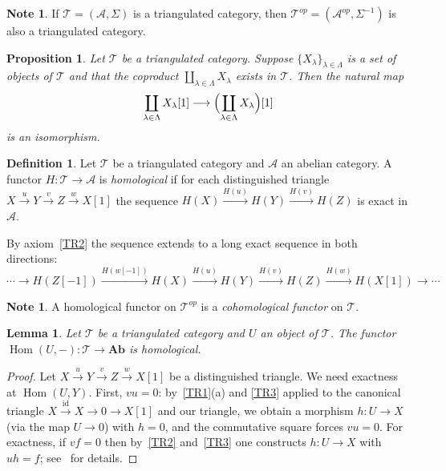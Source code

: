 \documentclass[12pt,a4paper]{article}
\newtheorem{proposition}[theorem]{Proposition}
\newtheorem{lemma}[theorem]{Lemma}
\theoremstyle{definition}
\newtheorem{definition}[theorem]{Definition}
\newtheorem{note}[theorem]{Note}
\newcommand{\Ab}{\mathbf{Ab}}
\newcommand{\Hom}{\operatorname{Hom}}
\newcommand{\id}{\mathrm{id}}
\begin{document}
\begin{note}\label{note:opposite}
If $\mathcal{T}=(\mathcal{A},\Sigma)$ is a triangulated category, then
$\mathcal{T}^{op}=(\mathcal{A}^{op},\Sigma^{-1})$ is also a triangulated category.
\end{note}

\begin{proposition}\label{prop:coproducts}
Let $\mathcal{T}$ be a triangulated category.  Suppose $\{X_\lambda\}_{\lambda\in\Lambda}$
is a set of objects of $\mathcal{T}$ and that the coproduct
$\coprod_{\lambda\in\Lambda} X_\lambda$ exists in $\mathcal{T}$.  Then the natural map
\[
  \coprod_{\lambda\in\Lambda} X_\lambda[1]
  \longrightarrow
  \Bigl(\coprod_{\lambda\in\Lambda} X_\lambda\Bigr)[1]
\]
is an isomorphism.
\end{proposition}

\begin{definition}\label{def:homological}
Let $\mathcal{T}$ be a triangulated category and $\mathcal{A}$ an abelian category.
A functor $H:\mathcal{T}\to\mathcal{A}$ is \emph{homological} if for each
distinguished triangle $X\xrightarrow{u} Y\xrightarrow{v} Z\xrightarrow{w} X[1]$
the sequence $H(X)\xrightarrow{H(u)} H(Y)\xrightarrow{H(v)} H(Z)$ is exact in
$\mathcal{A}$.
\end{definition}

By axiom~\ref{TR2} the sequence extends to a long exact sequence in both directions:
\[
  \cdots\to H(Z[-1])\xrightarrow{H(w[-1])} H(X)\xrightarrow{H(u)} H(Y)
  \xrightarrow{H(v)} H(Z)\xrightarrow{H(w)} H(X[1])\to\cdots
\]

\begin{note}
A homological functor on $\mathcal{T}^{op}$ is a \emph{cohomological functor} on
$\mathcal{T}$.
\end{note}

\begin{lemma}\label{lem:Hom-homological}
Let $\mathcal{T}$ be a triangulated category and $U$ an object of $\mathcal{T}$.
The functor $\Hom(U,-):\mathcal{T}\to\Ab$ is homological.
\end{lemma}

\begin{proof}
Let $X\xrightarrow{u} Y\xrightarrow{v} Z\xrightarrow{w} X[1]$ be a distinguished
triangle.  We need exactness at $\Hom(U,Y)$.  First, $vu=0$: by~\ref{TR1}(a) and
\ref{TR3} applied to the canonical triangle $X\xrightarrow{\id}X\to 0\to X[1]$ and
our triangle, we obtain a morphism $h:U\to X$ (via the map $U\to 0$) with $h=0$, and
the commutative square forces $vu=0$.  For exactness, if $vf=0$ then by~\ref{TR2}
and~\ref{TR3} one constructs $h:U\to X$ with $uh=f$; see~\cite{BBD} for details.
\end{proof}
\end{document}
